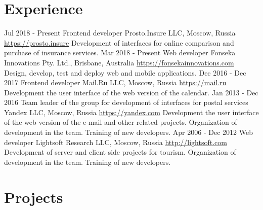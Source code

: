 \documentclass[11pt,a4paper]{moderncv}
\begin{document}
\newpage

\section{Experience}
\cventry
  {Jul 2018 - Present}
  {Frontend developer}
  {Prosto.Insure LLC, Moscow, Russia}
  {\newline{}\url{https://prosto.insure}}{}
  {Development of interfaces for online comparison and purchase of insurance services.}
\cventry
  {Mar 2018 - Present}
  {Web developer}
  {Fonseka Innovations Pty. Ltd., Brisbane, Australia}
  {\newline{}\url{https://fonsekainnovations.com}}{}
  {Design, develop, test and deploy web and mobile applications.}
\cventry
  {Dec 2016 - Dec 2017}
  {Frontend developer}
  {Mail.Ru LLC, Moscow, Russia}
  {\newline{}\url{https://mail.ru}}{}
  {Development the user interface of the web version of the calendar.}
\cventry
  {Jan 2013 - Dec 2016}
  {Team leader of the group for development of interfaces for postal services}
  {Yandex LLC, Moscow, Russia}
  {\newline{}\url{https://yandex.com}}{}
  {Development the user interface of the web version of the e-mail and other related projects.
  Organization of development in the team.\newline{}
  Training of new developers.}
\cventry
  {Apr 2006 - Dec 2012}
  {Web developer}
  {Lightsoft Research LLC, Moscow, Russia}
  {\newline{}\url{http://lightsoft.com}}{}
  {Development of server and client side projects for tourism.\newline{}
  Organization of development in the team.\newline{}
  Training of new developers.}

\section{Projects}
\end{document}
